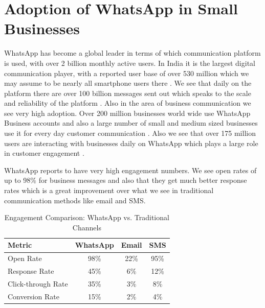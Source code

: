 
\section{Adoption of WhatsApp in Small Businesses}

WhatsApp has become a global leader in terms of which communication platform is used, with over 2 billion monthly active users. In India it is the largest digital communication player, with a reported user base of over 530 million which we may assume to be nearly all smartphone users there \cite{hyperleap_india2026}. We see that daily on the platform there are over 100 billion messages sent out which speaks to the scale and reliability of the platform \cite{infobip_stats2026}. Also in the area of business communication we see very high adoption. Over 200 million businesses world wide use WhatsApp Business accounts and also a large number of small and medium sized businesses use it for every day customer communication \cite{infobip_stats2026}. Also we see that over 175 million users are interacting with businesses daily on WhatsApp which plays a large role in customer engagement \cite{d7_stats2026}.

WhatsApp reports to have very high engagement numbers. We see open rates of up to 98\% for business messages and also that they get much better response rates which is a great improvement over what we see in traditional communication methods like email and SMS.

\begin{table}[htbp]
    \centering
    \begin{tabular}{lccc}
        \hline
        \textbf{Metric} & \textbf{WhatsApp} & \textbf{Email} & \textbf{SMS} \\
        \hline
        Open Rate & 98\% & 22\% & 95\% \\
        Response Rate & 45\% & 6\% & 12\% \\
        Click-through Rate & 35\% & 3\% & 8\% \\
        Conversion Rate & 15\% & 2\% & 4\% \\
        \hline
    \end{tabular}
    \vspace{0.2cm}
    \caption{Engagement Comparison: WhatsApp vs. Traditional Channels \cite{hyperleap_india2026}}
    \label{tab:engagement_stats}
\end{table}

